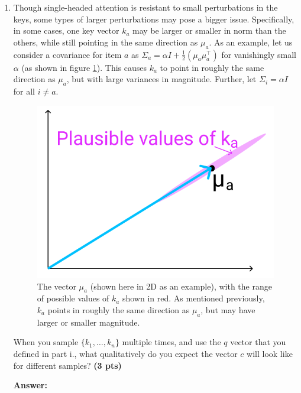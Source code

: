 \documentclass{assignment format}
\newenvironment{answer}{
    {\bf Answer:} \begingroup\color{red}
}{\endgroup}%
\begin{document}
\begin{enumerate}[label=(\alph*)]
\begin{enumerate}[label=(\roman*)]
\item Though single-headed attention is resistant to small perturbations in the keys, some types of larger perturbations may pose a bigger issue. Specifically, in some cases, one key vector $k_a$ may be larger or smaller in norm than the others, while still pointing in the same direction as $\mu_a$. As an example, let us consider a covariance for item $a$ as $\Sigma_a = \alpha I + \frac{1}{2}(\mu_a\mu_a^\top)$ for vanishingly small $\alpha$ (as shown in figure \ref{ka_plausible}). This causes $k_a$ to point in roughly the same direction as $\mu_a$, but with large variances in magnitude. Further, let $\Sigma_i = \alpha I$ for all $i \neq a$.
\begin{figure}[h]
\centering
\captionsetup{justification=centering,margin=2cm}
\includegraphics[width=0.35\linewidth]{ka_plausible.png}
\caption{The vector $\mu_a$ (shown here in 2D as an example), with the range of possible values of $k_a$ shown in red. As mentioned previously, $k_a$ points in roughly the same direction as $\mu_a$, but may have larger or smaller magnitude.}
\label{ka_plausible}
\end{figure}

When you sample $\{k_1,\dots,k_n\}$ multiple times, and use the $q$ vector that you defined in part i., what qualitatively do you expect the vector $c$ will look like for different samples? \textbf{(3 pts)}

\begin{answer}
\end{answer}
\end{enumerate}


\end{enumerate}
\end{document}
